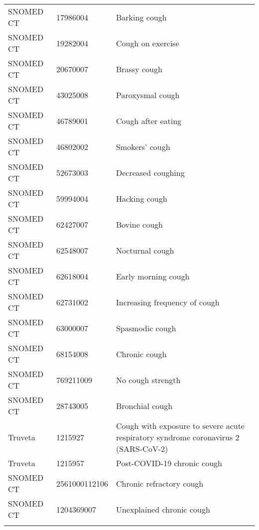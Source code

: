 \begin{longtable}{p{}p{}p{}}
  SNOMED CT & 17986004 & Barking cough \\ 
  SNOMED CT & 19282004 & Cough on exercise \\ 
  SNOMED CT & 20670007 & Brassy cough \\ 
  SNOMED CT & 43025008 & Paroxysmal cough \\ 
  SNOMED CT & 46789001 & Cough after eating \\ 
  SNOMED CT & 46802002 & Smokers' cough \\ 
  SNOMED CT & 52673003 & Decreased coughing \\ 
  SNOMED CT & 59994004 & Hacking cough \\ 
  SNOMED CT & 62427007 & Bovine cough \\ 
  SNOMED CT & 62548007 & Nocturnal cough \\ 
  SNOMED CT & 62618004 & Early morning cough \\ 
  SNOMED CT & 62731002 & Increasing frequency of cough \\ 
  SNOMED CT & 63000007 & Spasmodic cough \\ 
  SNOMED CT & 68154008 & Chronic cough \\ 
  SNOMED CT & 769211009 & No cough strength \\ 
  SNOMED CT & 28743005 & Bronchial cough \\ 
  Truveta & 1215927 & Cough with exposure to severe acute respiratory syndrome coronavirus 2 (SARS-CoV-2) \\ 
  Truveta & 1215957 & Post-COVID-19 chronic cough \\ 
  SNOMED CT & 2561000112106 & Chronic refractory cough \\ 
  SNOMED CT & 1204369007 & Unexplained chronic cough \\ 
  \hline
\label{tab:codes_cough}
\end{longtable}
